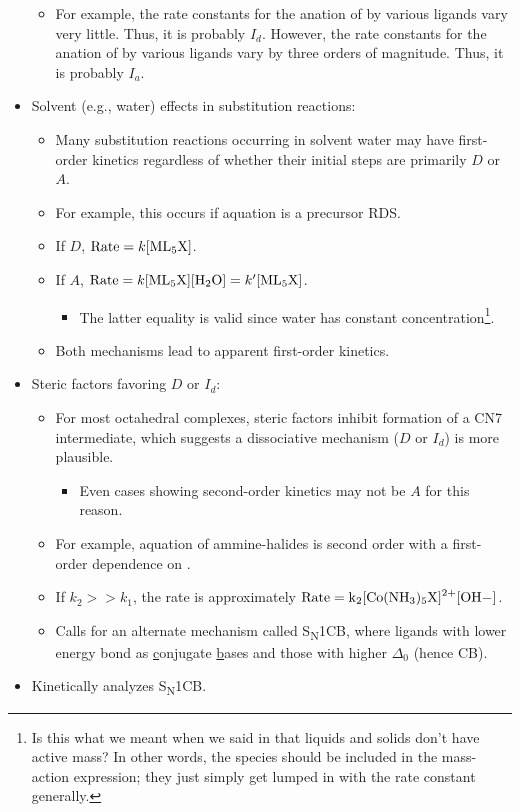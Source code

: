 \documentclass[../notes.tex]{subfiles}
\begin{document}
\begin{itemize}
\begin{itemize}
        \item For example, the rate constants for the anation of  by various ligands vary very little. Thus, it is probably $I_d$. However, the rate constants for the anation of  by various ligands vary by three orders of magnitude. Thus, it is probably $I_a$.
    \end{itemize}
    \item Solvent (e.g., water) effects in substitution reactions:
    \begin{itemize}
        \item Many substitution reactions occurring in solvent water may have first-order kinetics regardless of whether their initial steps are primarily $D$ or $A$.
        \item For example, this occurs if aquation is a precursor RDS.
        \item If $D$, $\text{Rate}=k\ce{[ML5X]}$.
        \item If $A$, $\text{Rate}=k\ce{[ML5X][H2O]}=k'\ce{[ML5X]}$.
        \begin{itemize}
            \item The latter equality is valid since water has constant concentration\footnote{Is this what we meant when we said in \textcite{bib:APChemNotes} that liquids and solids don't have active mass? In other words, the species should be included in the mass-action expression; they just simply get lumped in with the rate constant generally.}.
        \end{itemize}
        \item Both mechanisms lead to apparent first-order kinetics.
    \end{itemize}
    \item Steric factors favoring $D$ or $I_d$:
    \begin{itemize}
        \item For most octahedral complexes, steric factors inhibit formation of a CN7 intermediate, which suggests a dissociative mechanism ($D$ or $I_d$) is more plausible.
        \begin{itemize}
            \item Even cases showing second-order kinetics may not be $A$ for this reason.
        \end{itemize}
        \item For example, aquation of ammine-halides is second order with a first-order dependence on \ce{[OH-]}.
        \item If $k_2>>k_1$, the rate is approximately $\text{Rate}=\ce{k_2[Co(NH3)5X]^2+[OH-]}$.
        \item Calls for an alternate mechanism called S\textsubscript{N}1CB, where ligands with lower energy bond as \underline{c}onjugate \underline{b}ases and those with higher $\Delta_0$ (hence CB).
    \end{itemize}
    \item Kinetically analyzes S\textsubscript{N}1CB.
\end{itemize}
\end{document}
